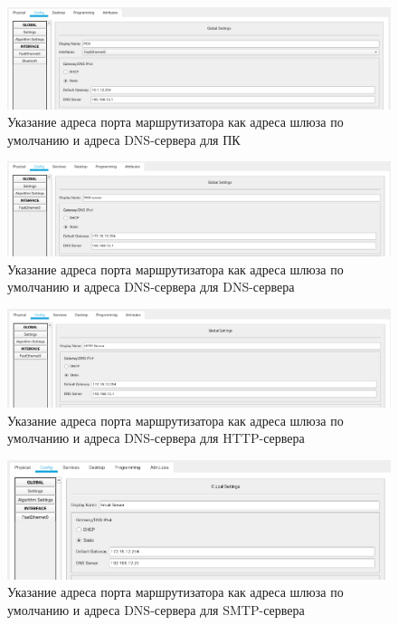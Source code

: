 \documentclass[12pt]{report}
\begin{document}
\begin{figure}[H]
	\begin{center}
		\includegraphics[scale=0.4]{img/6.png}
	\end{center}
	\caption{Указание адреса порта маршрутизатора как адреса шлюза по умолчанию и адреса DNS-сервера для ПК}
	\label{fig:6}
\end{figure}

\begin{figure}[H]
	\begin{center}
		\includegraphics[scale=0.4]{img/7.png}
	\end{center}
	\caption{Указание адреса порта маршрутизатора как адреса шлюза по умолчанию и адреса DNS-сервера для DNS-сервера}
	\label{fig:7}
\end{figure}

\begin{figure}[H]
	\begin{center}
		\includegraphics[scale=0.4]{img/8.png}
	\end{center}
	\caption{Указание адреса порта маршрутизатора как адреса шлюза по умолчанию и адреса DNS-сервера для HTTP-сервера}
	\label{fig:8}
\end{figure}

\begin{figure}[H]
	\begin{center}
		\includegraphics[scale=0.4]{img/9.png}
	\end{center}
	\caption{Указание адреса порта маршрутизатора как адреса шлюза по умолчанию и адреса DNS-сервера для SMTP-сервера}
	\label{fig:9}
\end{figure}
\end{document}

